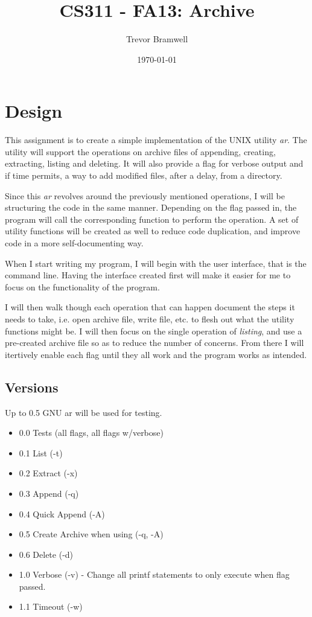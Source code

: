 \documentclass[letterpaper,10pt]{article}
\title{CS311 - FA13: Archive}
\date{\today}
\author{Trevor Bramwell}
\begin{document}
\maketitle

\section{Design}
    This assignment is to create a simple implementation of the UNIX
    utility \emph{ar}. The utility will support the operations on archive files
    of appending, creating, extracting, listing and deleting. It will
    also provide a flag for verbose output and if time permits, a way to
    add modified files, after a delay, from a directory.

    Since this \emph{ar} revolves around the previously mentioned
    operations, I will be structuring the code in the same manner.
    Depending on the flag passed in, the program will call the
    corresponding function to perform the operation. A set of utility
    functions will be created as well to reduce code duplication, and
    improve code in a more self-documenting way.

    When I start writing my program, I will begin with the user
    interface, that is the command line. Having the interface created
    first will make it easier for me to focus on the functionality of
    the program.

    I will then walk though each operation that can happen document the
    steps it needs to take, i.e. open archive file, write file, etc. to
    flesh out what the utility functions might be. I will then focus on
    the single operation of \emph{listing}, and use a pre-created
    archive file so as to reduce the number of concerns. From there I
    will itertively enable each flag until they all work and the program
    works as intended.

\subsection{Versions}

Up to 0.5 GNU ar will be used for testing.

\begin{itemize}
    \item 0.0 Tests (all flags, all flags w/verbose)
    \item 0.1 List (-t)
    \item 0.2 Extract (-x)
    \item 0.3 Append (-q)
    \item 0.4 Quick Append (-A)
    \item 0.5 Create Archive when using (-q, -A)
    \item 0.6 Delete (-d)
    \item 1.0 Verbose (-v) - Change all printf statements to only execute when flag
          passed.
    \item 1.1 Timeout (-w)
\end{itemize}
\end{document}
